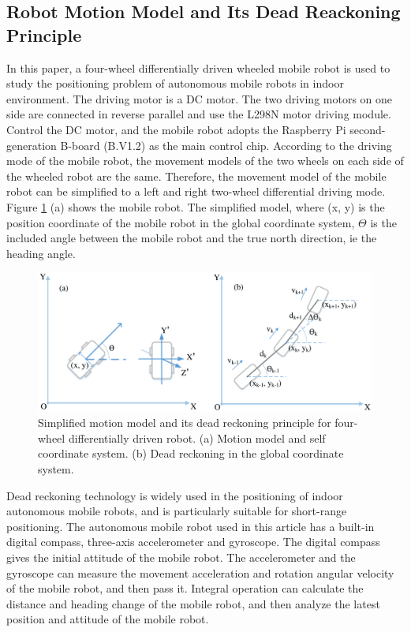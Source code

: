 \documentclass{llncs}
\begin{document}
\subsection{Robot Motion Model and Its Dead Reackoning Principle}

In this paper, a four-wheel differentially driven wheeled mobile robot is used to study the positioning problem of autonomous mobile robots in indoor environment. The driving motor is a DC motor. The two driving motors on one side are connected in reverse parallel and use the L298N motor driving module. Control the DC motor, and the mobile robot adopts the Raspberry Pi second-generation B-board (B.V1.2) as the main control chip. According to the driving mode of the mobile robot, the movement models of the two wheels on each side of the wheeled robot are the same. Therefore, the movement model of the mobile robot can be simplified to a left and right two-wheel differential driving mode. Figure \ref{fig-model-pdr} (a) shows the mobile robot. The simplified model, where (x, y) is the position coordinate of the mobile robot in the global coordinate system, $\Theta$ is the included angle between the mobile robot and the true north direction, ie the heading angle.

\begin{figure}[!htbp]
	\centering
	\includegraphics[width=4.7in]{RobotMatch-MotionModel}
	\caption{Simplified motion model and its dead reckoning principle for four-wheel differentially driven robot. (a) Motion model and self coordinate system. (b) Dead reckoning in the global coordinate system.}
	\label{fig-model-pdr}
\end{figure}

Dead reckoning technology is widely used in the positioning of indoor autonomous mobile robots, and is particularly suitable for short-range positioning. The autonomous mobile robot used in this article has a built-in digital compass, three-axis accelerometer and gyroscope. The digital compass gives the initial attitude of the mobile robot. The accelerometer and the gyroscope can measure the movement acceleration and rotation angular velocity of the mobile robot, and then pass it. Integral operation can calculate the distance and heading change of the mobile robot, and then analyze the latest position and attitude of the mobile robot.
\end{document}
